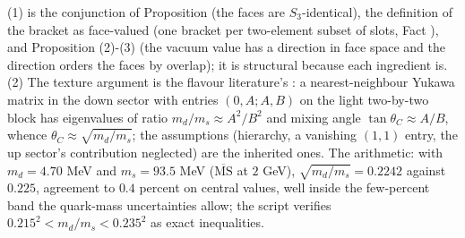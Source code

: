 (1) is the conjunction of Proposition  (the faces are $S_{3}$-identical), the definition of the bracket as face-valued (one bracket per two-element subset of slots, Fact ), and Proposition (2)-(3) (the vacuum value has a direction in face space and the direction orders the faces by overlap); it is structural because each ingredient is. (2) The texture argument is the flavour literature's \cite{GST1968, Fritzsch1978}: a nearest-neighbour Yukawa matrix in the down sector with entries $(0, A; A, B)$ on the light two-by-two block has eigenvalues of ratio $m_{d}/m_{s} \approx A^{2}/B^{2}$ and mixing angle $\tan\theta_{C} \approx A/B$, whence $\theta_{C} \approx \sqrt{m_{d}/m_{s}}$; the assumptions (hierarchy, a vanishing $(1,1)$ entry, the up sector's contribution neglected) are the inherited ones. The arithmetic: with $m_{d} = 4.70$ MeV and $m_{s} = 93.5$ MeV \cite{PDG2024} ($\overline{\mathrm{MS}}$ at $2$ GeV), $\sqrt{m_{d}/m_{s}} = 0.2242$ against $0.225$, agreement to $0.4$ percent on central values, well inside the few-percent band the quark-mass uncertainties allow; the script verifies $0.215^{2} < m_{d}/m_{s} < 0.235^{2}$ as exact inequalities.
